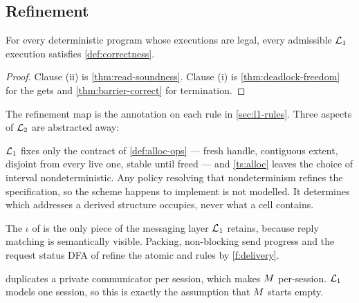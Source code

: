 \subsection{Refinement}
\label{sec:l1-refinement}

\begin{corollary}\label{cor:refinement}
For every deterministic program whose executions are legal, every admissible
$\mathcal{L}_1$ execution satisfies \cref{def:correctness}.
\end{corollary}

\begin{proof}
Clause (ii) is \cref{thm:read-soundness}. Clause (i) is
\cref{thm:deadlock-freedom} for the gets and \cref{thm:barrier-correct} for
\gls{termination}.
\end{proof}

The refinement map is the annotation on each rule in \cref{sec:l1-rules}.
Three aspects of $\mathcal{L}_2$ are abstracted away:

\begin{description}[leftmargin=1.1cm,style=nextline,font=\normalfont\bfseries]
\item[The allocation policy.] $\mathcal{L}_1$ fixes only the contract of
  \cref{def:alloc-ops} --- fresh handle, contiguous extent, disjoint from
  every live one, stable until freed --- and \cref{ts:alloc} leaves the choice
  of interval nondeterministic. Any policy resolving that nondeterminism
  refines the specification, so the scheme
   happens to implement is not modelled. It
  determines which addresses a derived structure occupies, never what a
  \gls{cell} contains.

\item[MPI tags, buffers and packing.] The $\iota$ of  is
  the only piece of the messaging layer $\mathcal{L}_1$ retains, because reply matching
  is semantically visible. Packing, non-blocking send progress and the
  request status DFA of  refine the atomic
   and  rules by \ref{f:delivery}.

\item[Session communicators.]  duplicates a private
  communicator per \gls{session}, which makes $M$ per-session. $\mathcal{L}_1$ models one
  session, so this is exactly the assumption that $M$ starts empty.
\end{description}
